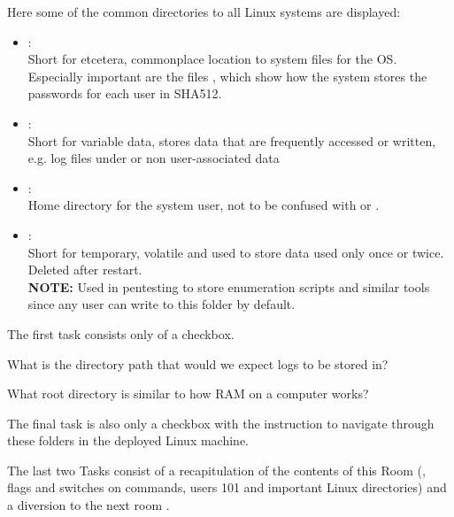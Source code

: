 \begin{task}

Here some of the common directories to all Linux systems are displayed: 
\begin{itemize}
\item {}:\\
Short for etcetera, commonplace location to system files for the OS.\\
Especially important are the files , which show how the system stores the passwords for each user in SHA512.
\item {}:\\
Short for variable data, stores data that are frequently accessed or written, e.g. log files under  or non user-associated data
\item {}:\\
Home directory for the  system user, not to be confused with  or . 
\item {}: \\
Short for temporary, volatile and used to store data used only once or twice. Deleted after restart.\\
\textbf{NOTE:} Used in pentesting to store enumeration scripts and similar tools since any user can write to this folder by default.
\end{itemize}

The first task consists only of a checkbox.
\begin{Q}
What is the directory path that would we expect logs to be stored in?
\end{Q}
\begin{A}
\end{A}
\begin{Q}
What root directory is similar to how RAM on a computer works?
\end{Q}
\begin{A}
\end{A}
	{}

The final task is also only a checkbox with the instruction to navigate through these folders in the deployed Linux machine. 
\end{task}
The last two Tasks consist of a recapitulation of the contents of this Room (, flags and switches on commands, users 101 and important Linux directories) and a diversion to the next room .